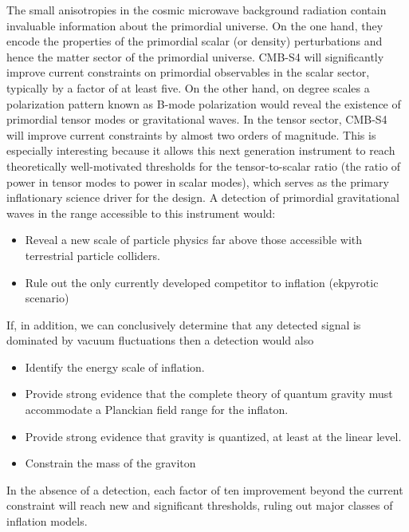 The small anisotropies in the cosmic microwave background radiation contain invaluable information about the primordial universe. On the one hand, they encode the properties of the primordial scalar (or density) perturbations and hence the matter sector of the primordial universe. 
CMB-S4 will significantly improve current constraints on primordial observables in the scalar sector, typically by a factor of at least five. On the other hand, on degree scales a polarization pattern known as B-mode polarization would reveal the existence of primordial tensor modes or gravitational waves. In the tensor sector, CMB-S4 will improve current constraints by almost two orders of magnitude. This is especially interesting because it allows this next generation instrument to reach theoretically well-motivated thresholds for the tensor-to-scalar ratio (the ratio of power in tensor modes to power in scalar modes), which serves as the primary inflationary science driver for the design. A detection of primordial gravitational waves in the range accessible to this instrument would:
\begin{itemize}
 \item Reveal a new scale of particle physics far above those accessible with terrestrial particle colliders.  
\item  Rule out the only currently developed competitor to inflation (ekpyrotic scenario)
\end{itemize}
If, in addition, we can conclusively determine that any detected signal is dominated by vacuum fluctuations then a detection would also
\begin{itemize}
 \item Identify the energy scale of inflation. 
 \item Provide strong evidence that the complete theory of quantum gravity must accommodate a Planckian field range for the inflaton.
 \item Provide strong evidence that gravity is quantized, at least at the linear level.
\item  Constrain the mass of the graviton
\end{itemize}
In the absence of a detection, each factor of ten improvement beyond the current constraint will reach new and significant thresholds, ruling out major classes of inflation models. 

